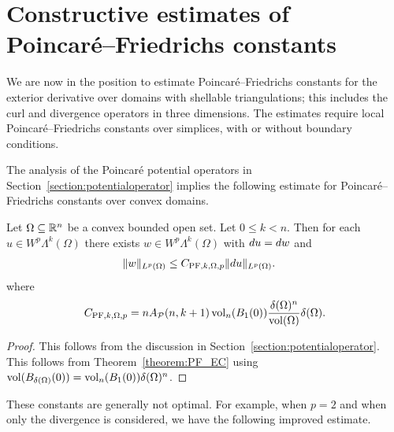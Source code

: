 \documentclass[10pt,letterpaper]{article}
\begin{document}
\section{Constructive estimates of Poincar\'e--Friedrichs constants}\label{section:poincarefriedrichs}

We are now in the position to estimate Poincar\'e--Friedrichs constants for the exterior derivative over domains with shellable triangulations; this includes the curl and divergence operators in three dimensions. 
The estimates require local Poincar\'e--Friedrichs constants over simplices, 
with or without boundary conditions. 

The analysis of the Poincar\'e potential operators in Section~\ref{section:potentialoperator}
implies the following estimate for Poincar\'e--Friedrichs constants over convex domains. 

\begin{lemma}\label{lemma:PFexteriorsimplex}
    Let $\Omega \subseteq {\mathbb R}^{n}$ be a convex bounded open set. 
    Let $0 \leq k < n$. 
    Then for each $u \in W^{p}\Lambda^{k}(\Omega)$ 
    there exists $w \in W^{p}\Lambda^{k}(\Omega)$ 
    with $d u = d w$ and 
    \begin{align*}
        \| w \|_{L^{p}(\Omega)}
        &
        \leq 
        C_{{\rm{PF}},k,\Omega,p}
        \| d u \|_{L^{p}(\Omega)}
        .
    \end{align*}
    where 
    \begin{align*}
        C_{{\rm{PF}},k,\Omega,p} 
        = 
        n A_{{\mathcal P}}(n,k+1) 
        \operatorname{vol}_{n}(B_1(0)) 
        \frac{ {\delta}(\Omega)^{n} }{ \operatorname{vol}(\Omega) } 
        {\delta}(\Omega)
        .
    \end{align*}
\end{lemma}
\begin{proof}
    This follows from the discussion in Section~\ref{section:potentialoperator}.
    This follows from Theorem~\ref{theorem:PF_EC} using $\operatorname{vol}(B_{{\delta}(\Omega)}(0)) = \operatorname{vol}_{n}(B_1(0)) {\delta}(\Omega)^{n}$.
\end{proof}

These constants are generally not optimal. 
For example, when $p=2$ and when only the divergence is considered, 
we have the following improved estimate. 
\end{document}
